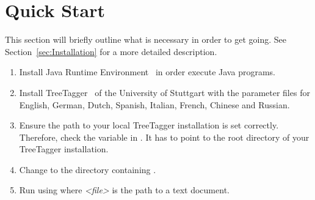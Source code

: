 \section{Quick Start}\label{sec:QuickStart}
This section will briefly outline what is necessary in order to get \product{} going. See Section~\ref{sec:Installation} for a more detailed description.
\begin{enumerate}
\item Install Java Runtime Environment~\cite{Java} in order execute Java programs.
\item Install TreeTagger~\cite{TreeTagger} of the University of Stuttgart with the parameter files for English, German, Dutch, Spanish, Italian, French, Chinese and Russian.
\item Ensure the path to your local TreeTagger installation is set correctly. Therefore, check the variable  in \configFile{}. It has to point to the root directory of your TreeTagger installation.
\item Change to the directory containing \executableFile{}.
\item Run \product{} using \newline {} \newline where \emph{<file>} is the path to a text document.
\end{enumerate}
